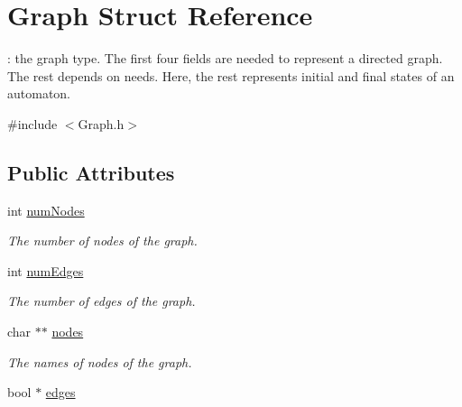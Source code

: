 \hypertarget{structGraph}{}\section{Graph Struct Reference}
\label{structGraph}


\+: the graph type. The first four fields are needed to represent a directed graph. The rest depends on needs. Here, the rest represents initial and final states of an automaton.  




{\ttfamily \#include $<$Graph.\+h$>$}

\subsection*{Public Attributes}
\begin{DoxyCompactItemize}
\item 
int \hyperlink{structGraph_ad3db12d7f8327a6717fd161d694e43c0}{num\+Nodes}\hypertarget{structGraph_ad3db12d7f8327a6717fd161d694e43c0}{}\label{structGraph_ad3db12d7f8327a6717fd161d694e43c0}

\begin{DoxyCompactList}\small\item\em The number of nodes of the graph. \end{DoxyCompactList}\item 
int \hyperlink{structGraph_a4f98dc06b0c1e32b27fa26efc0e11777}{num\+Edges}\hypertarget{structGraph_a4f98dc06b0c1e32b27fa26efc0e11777}{}\label{structGraph_a4f98dc06b0c1e32b27fa26efc0e11777}

\begin{DoxyCompactList}\small\item\em The number of edges of the graph. \end{DoxyCompactList}\item 
char $\ast$$\ast$ \hyperlink{structGraph_aa08cad811e4bd8af7d8592d215009205}{nodes}\hypertarget{structGraph_aa08cad811e4bd8af7d8592d215009205}{}\label{structGraph_aa08cad811e4bd8af7d8592d215009205}

\begin{DoxyCompactList}\small\item\em The names of nodes of the graph. \end{DoxyCompactList}\item 
bool $\ast$ \hyperlink{structGraph_a62f3e0acacf556871b976b1c7ad66c54}{edges}\hypertarget{structGraph_a62f3e0acacf556871b976b1c7ad66c54}{}\label{structGraph_a62f3e0acacf556871b976b1c7ad66c54}


\end{DoxyCompactItemize}
